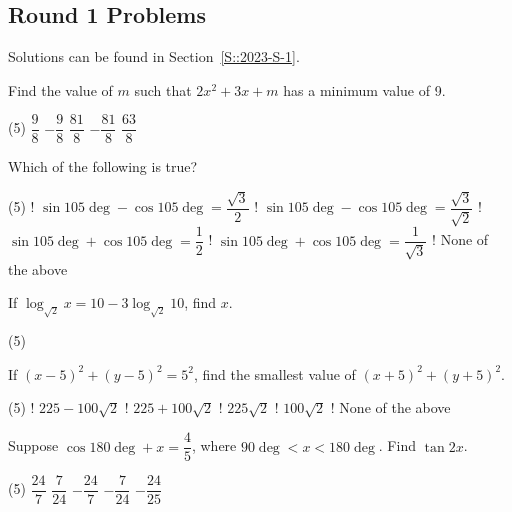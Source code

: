 \subsection{Round 1 Problems}

Solutions can be found in Section~\ref{S::2023-S-1}.

\mcq

\begin{enumerate}
    \hyperrefitem[Q::2023-S-1-1] Find the value of $m$ such that $2x^2 + 3x + m$ has a minimum value of 9.
    \begin{tasks}(5)
        \task $\dfrac98$
        \task $-\dfrac98$
        \task $\dfrac{81}8$
        \task $-\dfrac{81}{8}$
        \task $\dfrac{63}{8}$
    \end{tasks}
    \hyperrefitem[Q::2023-S-1-2] Which of the following is true?
    \begin{tasks}(5)
        \task! $\sin{105\deg} - \cos{105}\deg = \dfrac{\sqrt3}{2}$
        \task! $\sin{105\deg} - \cos{105}\deg = \dfrac{\sqrt3}{\sqrt2}$
        \task! $\sin{105\deg} + \cos{105}\deg = \dfrac12$
        \task! $\sin{105\deg} + \cos{105}\deg = \dfrac1{\sqrt3}$
        \task! None of the above
    \end{tasks}
    \hyperrefitem[Q::2023-S-1-3] If $\log_{\sqrt2} x = 10 - 3\log_{\sqrt2} 10$, find $x$.
    \begin{tasks}(5)
    \end{tasks}
    \hyperrefitem[Q::2023-S-1-4] If $(x-5)^2 + (y-5)^2 = 5^2$, find the smallest value of $(x+5)^2 + (y+5)^2$.
    \begin{tasks}(5)
        \task! $225 - 100\sqrt2$
        \task! $225 + 100\sqrt2$
        \task! $225\sqrt2$
        \task! $100\sqrt2$
        \task! None of the above
    \end{tasks}
    \hyperrefitem[Q::2023-S-1-5] Suppose $\cos{180\deg + x} = \dfrac45$, where $90\deg < x < 180\deg$. Find $\tan{2x}$.
    \begin{tasks}(5)
        \task $\dfrac{24}{7}$
        \task $\dfrac{7}{24}$
        \task $-\dfrac{24}{7}$
        \task $-\dfrac{7}{24}$
        \task $-\dfrac{24}{25}$
    \end{tasks}
\end{enumerate}

\sq

